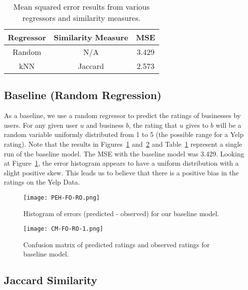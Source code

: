 \documentclass[10pt]{article}
\begin{document}
\begin{table}[ht]
\centering 
\begin{tabular}{c c c}
\hline\hline
Regressor & Similarity Measure & MSE \\ [0.5ex]
\hline
Random & N/A & 3.429 \\
kNN & Jaccard & 2.573 \\ [1ex]
\hline 
\end{tabular}
\caption{Mean squared error results from various regressors and similarity measures.}
\label{table: results}
\end{table}

\subsection{Baseline (Random Regression)}
As a baseline, we use a random regressor to predict the ratings of businesses by users. For any given user $u$ and business $b$, the rating that $u$ gives to $b$ will be a random variable uniformly distributed from 1 to 5 (the possible range for a Yelp rating). Note that the results in Figures~\ref{fig: baselinehisto} and~\ref{fig: baselineconfusion} and Table~\ref{table: results} represent a single run of the baseline model. The MSE with the baseline model was 3.429. Looking at Figure~\ref{fig: baselinehisto}, the error histogram appears to have a uniform distribution with a slight positive skew. This leads us to believe that there is a positive bias in the ratings on the Yelp Data.

\begin{figure}[h]
\centering
\texttt{[image: PEH-FO-RO.png]}
\caption{Histogram of errors (predicted - observed) for our baseline model.}
\label{fig: baselinehisto}
\end{figure}

\begin{figure}[h!]
\centering
\texttt{[image: CM-FO-RO-1.png]}
\caption{Confusion matrix of predicted ratings and observed ratings for baseline model.}
\label{fig: baselineconfusion}
\end{figure}

\subsection{Jaccard Similarity}
\end{document}
